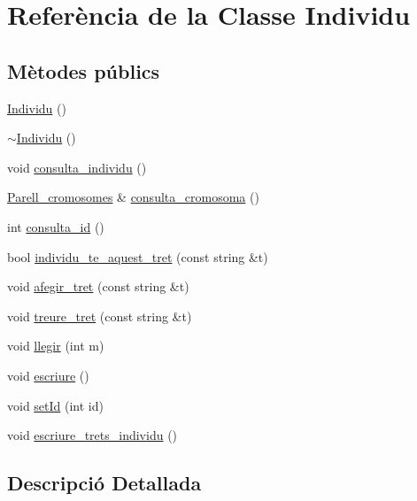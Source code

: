 \hypertarget{class_individu}{}\section{Referència de la Classe Individu}
\label{class_individu}
\subsection*{Mètodes públics}
\begin{DoxyCompactItemize}
\item 
\hyperlink{class_individu_ac35091404cfbf11946694806aefa9e7e}{Individu} ()
\item 
\hyperlink{class_individu_a84dcf2842927993d6c9ab833dfb6997a}{$\sim$\+Individu} ()
\item 
void \hyperlink{class_individu_adf2f7e8027a1a6123e04ec8ed5cf3cf5}{consulta\+\_\+individu} ()
\item 
\hyperlink{class_parell__cromosomes}{Parell\+\_\+cromosomes} \& \hyperlink{class_individu_a8c84ef825327290b8ae2ae3d6310c96b}{consulta\+\_\+cromosoma} ()
\item 
int \hyperlink{class_individu_a1340fdffb499f88aab592395ca854ad8}{consulta\+\_\+id} ()
\item 
bool \hyperlink{class_individu_ad87c08e58383d3c4a678041632978894}{individu\+\_\+te\+\_\+aquest\+\_\+tret} (const string \&t)
\item 
void \hyperlink{class_individu_a4d59ceca36c04dba1031ec2f846a800a}{afegir\+\_\+tret} (const string \&t)
\item 
void \hyperlink{class_individu_ad0dcc9347b1477a1e9b2fc2acc35077b}{treure\+\_\+tret} (const string \&t)
\item 
void \hyperlink{class_individu_a971fdef44c1a4e9ca4b1effe638f3441}{llegir} (int m)
\item 
void \hyperlink{class_individu_acf0bb3e950c72ec62c1ca95b501207ff}{escriure} ()
\item 
void \hyperlink{class_individu_afb68059599aa269211490bb1f2fe0e8b}{set\+Id} (int id)
\item 
void \hyperlink{class_individu_aedc7bb9f9b8a1d48b25378cb559f9da5}{escriure\+\_\+trets\+\_\+individu} ()
\end{DoxyCompactItemize}


\subsection{Descripció Detallada}


